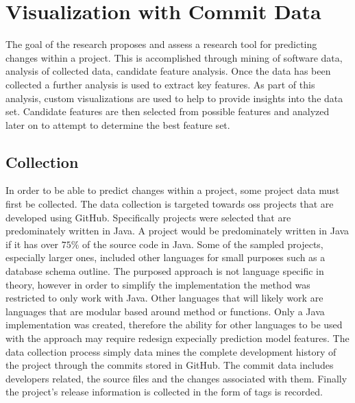 \chapter{Visualization with Commit Data}
\label{chap:visualization}

The goal of the research proposes and assess a research tool for predicting changes within a project. This is accomplished through mining of software data, analysis of collected data, candidate feature analysis. Once the data has been collected a further analysis is used to extract key features. As part of this analysis, custom visualizations are used to help to provide insights into the data set. Candidate features are then selected from possible features and analyzed later on to attempt to determine the best feature set.


\section{Collection}
\label{sec:collection}

In order to be able to predict changes within a project, some project data must first be collected. The data collection is targeted towards \gls{oss} projects that are developed using GitHub. Specifically projects were selected that are predominately written in Java. A project would be predominately written in Java if it has over $75\%$ of the source code in Java. Some of the sampled projects, especially larger ones, included other languages for small purposes such as a database schema outline. The purposed approach is not language specific in theory, however in order to simplify the implementation the method was restricted to only work with Java. Other languages that will likely work are languages that are modular based around method or functions. Only a Java implementation was created, therefore the ability for other languages to be used with the approach may require redesign expecially prediction model features. The data collection process simply data mines the complete development history of the project through the commits stored in GitHub. The commit data includes developers related, the source files and the changes associated with them. Finally the project's release information is collected in the form of tags is recorded.

